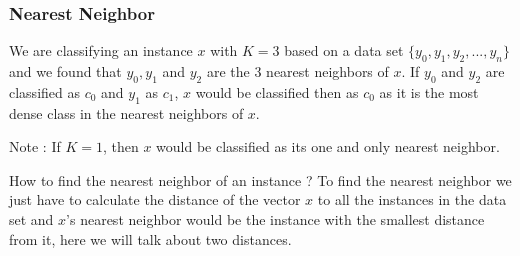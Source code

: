 \documentclass{beamer}
\begin{document}
\begin{frame}
\frametitle{Nearest Neighbor}
\begin{example}

We are classifying an instance $ x $ with $ K = 3 $ based on a data set $ \{y_0,y_1,y_2,...,y_n\} $ and we found that $ y_0, y_1 $ and $ y_2 $ are the 3 nearest neighbors of $ x $. If $ y_0 $ and $ y_2 $ are classified as $ c_0 $ and $ y_1 $ as $ c_1 $, $ x  $ would be classified then as $ c_0 $ as it is the most dense class in the nearest neighbors of $ x $.

\end{example}
\begin{alertblock}{Note :}
If $ K = 1 $, then $ x $ would be classified as its one and only nearest neighbor.
\end{alertblock}
\begin{block}{How to find the nearest neighbor of an instance ?}
To find the nearest neighbor we just have to calculate the distance of the vector $ x $ to all the instances in the data set and $ x $'s nearest neighbor would be the instance with the smallest distance from it, here we will talk about two distances.
\end{block}
\end{frame}
\end{document}
